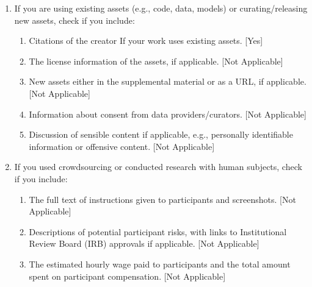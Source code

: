 \documentclass[twoside]{article}
\theoremstyle{plain}
\newif\ifnotappendix
\begin{document}
\begin{enumerate}
 \item If you are using existing assets (e.g., code, data, models) or curating/releasing new assets, check if you include:
 \begin{enumerate}
   \item Citations of the creator If your work uses existing assets. [Yes]
   \item The license information of the assets, if applicable. [Not Applicable]
   \item New assets either in the supplemental material or as a URL, if applicable. [Not Applicable]
   \item Information about consent from data providers/curators. [Not Applicable]
   \item Discussion of sensible content if applicable, e.g., personally identifiable information or offensive content. [Not Applicable]
 \end{enumerate}

 \item If you used crowdsourcing or conducted research with human subjects, check if you include:
 \begin{enumerate}
   \item The full text of instructions given to participants and screenshots. [Not Applicable]
   \item Descriptions of potential participant risks, with links to Institutional Review Board (IRB) approvals if applicable. [Not Applicable]
   \item The estimated hourly wage paid to participants and the total amount spent on participant compensation. [Not Applicable]
 \end{enumerate}

 \end{enumerate}

\clearpage


\appendix
\notappendixfalse
\onecolumn
\end{document}
